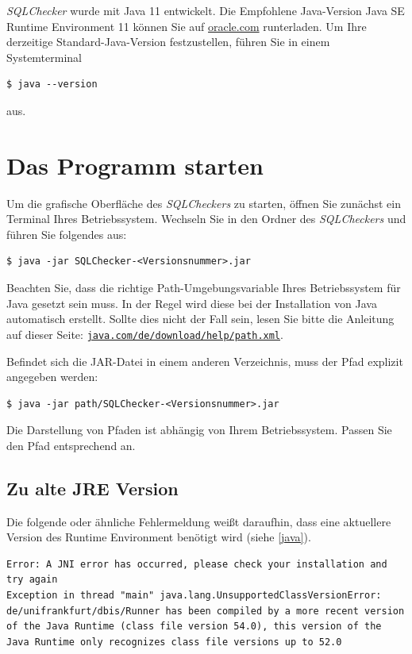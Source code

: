 \documentclass[11pt]{article}
\begin{document}
\label{java}
\textit{SQLChecker} wurde mit Java 11 entwickelt. Die Empfohlene Java-Version Java SE Runtime Environment 11 können Sie auf \href{https://www.oracle.com/java/technologies/javase-jdk11-downloads.html}{oracle.com} runterladen. Um Ihre derzeitige Standard-Java-Version festzustellen, führen Sie in einem Systemterminal 
\begin{verbatim}
$ java --version
\end{verbatim}
aus.

\section{Das Programm starten}
Um die grafische Oberfläche des \textit{SQLCheckers} zu starten, öffnen Sie zunächst ein Terminal Ihres Betriebssystem. Wechseln Sie in den Ordner des \textit{SQLCheckers} und führen Sie folgendes aus:
\begin{verbatim}
$ java -jar SQLChecker-<Versionsnummer>.jar
\end{verbatim}
Beachten Sie, dass die richtige Path-Umgebungsvariable Ihres Betriebssystem für Java gesetzt sein muss. In der Regel wird diese bei der Installation von Java automatisch erstellt. Sollte dies nicht der Fall sein, lesen Sie bitte die Anleitung auf dieser Seite:  \href{https://www.java.com/de/download/help/path.xml}{\texttt{java.com/de/download/help/path.xml}}.

Befindet sich die JAR-Datei in einem anderen Verzeichnis, muss der Pfad explizit angegeben werden:

\begin{verbatim}
$ java -jar path/SQLChecker-<Versionsnummer>.jar
\end{verbatim}
Die Darstellung von Pfaden ist abhängig von Ihrem Betriebssystem. Passen Sie den Pfad entsprechend an.

\subsection{Zu alte JRE Version}
Die folgende oder ähnliche Fehlermeldung weißt daraufhin, dass eine aktuellere Version des Runtime Environment benötigt wird (siehe \ref{java}).
\begin{verbatim}
Error: A JNI error has occurred, please check your installation and try again
Exception in thread "main" java.lang.UnsupportedClassVersionError: de/unifrankfurt/dbis/Runner has been compiled by a more recent version of the Java Runtime (class file version 54.0), this version of the Java Runtime only recognizes class file versions up to 52.0
\end{verbatim}
\end{document}
